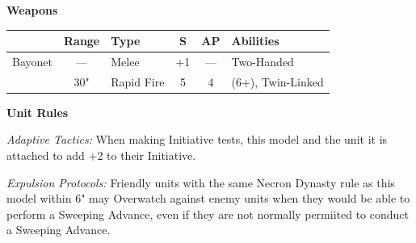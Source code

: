 \begin{minipage}[t]{0.72\textwidth}
	\vspace*{2em}
	\textbf{Weapons}
	
	\begin{tabular}{L{90 pt} c C{40pt} *{2}{c} >{\raggedright\arraybackslash}p{130pt}}
		& Range & Type & S & AP & Abilities \\
		\hline
		Bayonet & — & Melee & +1 & — & Two-Handed \\
		 & 30" & Rapid Fire & 5 & 4 &  (6+), Twin-Linked \\	
	\end{tabular}

	
	\vspace*{2em}
	\textbf{Unit Rules}

	\textit{Adaptive Tactics:} When making Initiative tests, this model and the unit it is attached to add +2 to their Initiative.

	\textit{Expulsion Protocols:} Friendly units with the same Necron Dynasty rule as this model within 6" may Overwatch against enemy units when they would be able to perform a Sweeping Advance, even if they are not normally permiited to conduct a Sweeping Advance.

\end{minipage}



\newpage
\subsubsection[Vargard]{}

